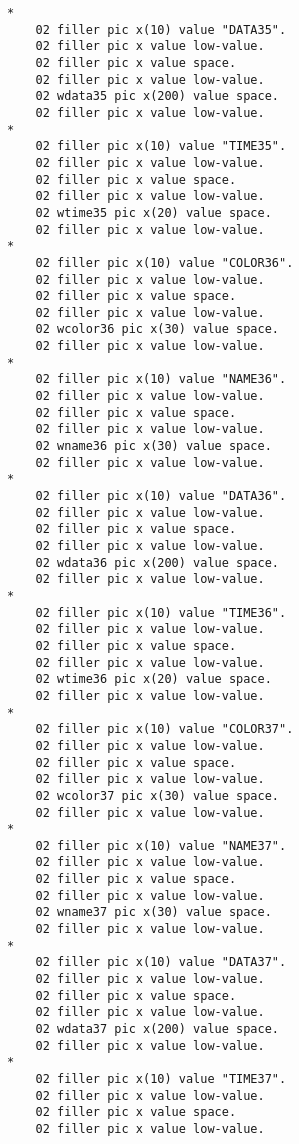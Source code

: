 {{{\begin{verbatim}
      *    
          02 filler pic x(10) value "DATA35".
          02 filler pic x value low-value.
          02 filler pic x value space.
          02 filler pic x value low-value.
          02 wdata35 pic x(200) value space.
          02 filler pic x value low-value.
      *    
          02 filler pic x(10) value "TIME35".
          02 filler pic x value low-value.
          02 filler pic x value space.
          02 filler pic x value low-value.
          02 wtime35 pic x(20) value space.
          02 filler pic x value low-value.
      *    
          02 filler pic x(10) value "COLOR36".
          02 filler pic x value low-value.
          02 filler pic x value space.
          02 filler pic x value low-value.
          02 wcolor36 pic x(30) value space.
          02 filler pic x value low-value.
      *    
          02 filler pic x(10) value "NAME36".
          02 filler pic x value low-value.
          02 filler pic x value space.
          02 filler pic x value low-value.
          02 wname36 pic x(30) value space.
          02 filler pic x value low-value.
      *    
          02 filler pic x(10) value "DATA36".
          02 filler pic x value low-value.
          02 filler pic x value space.
          02 filler pic x value low-value.
          02 wdata36 pic x(200) value space.
          02 filler pic x value low-value.
      *    
          02 filler pic x(10) value "TIME36".
          02 filler pic x value low-value.
          02 filler pic x value space.
          02 filler pic x value low-value.
          02 wtime36 pic x(20) value space.
          02 filler pic x value low-value.
      *    
          02 filler pic x(10) value "COLOR37".
          02 filler pic x value low-value.
          02 filler pic x value space.
          02 filler pic x value low-value.
          02 wcolor37 pic x(30) value space.
          02 filler pic x value low-value.
      *    
          02 filler pic x(10) value "NAME37".
          02 filler pic x value low-value.
          02 filler pic x value space.
          02 filler pic x value low-value.
          02 wname37 pic x(30) value space.
          02 filler pic x value low-value.
      *    
          02 filler pic x(10) value "DATA37".
          02 filler pic x value low-value.
          02 filler pic x value space.
          02 filler pic x value low-value.
          02 wdata37 pic x(200) value space.
          02 filler pic x value low-value.
      *    
          02 filler pic x(10) value "TIME37".
          02 filler pic x value low-value.
          02 filler pic x value space.
          02 filler pic x value low-value.

\end{verbatim}}}}
